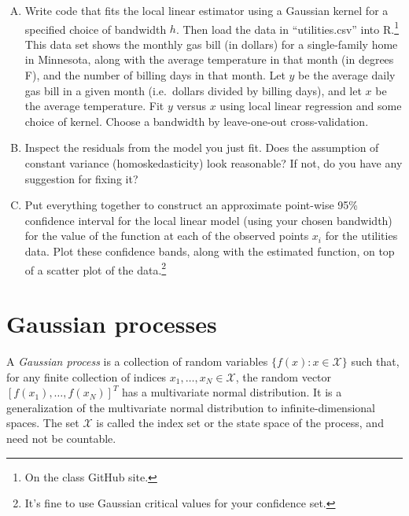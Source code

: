 \documentclass[11pt]{article}
\begin{document}
\begin{enumerate}[(A)]
\item Write code that fits the local linear estimator using a Gaussian kernel for a specified choice of bandwidth $h$. Then load the data in ``utilities.csv'' into R.\footnote{On the class GitHub site.}  This data set shows the monthly gas bill (in dollars) for a single-family home in Minnesota, along with the average temperature in that month (in degrees F), and the number of billing days in that month.  Let $y$ be the average daily gas bill in a given month (i.e.~dollars divided by billing days), and let $x$ be the average temperature.  Fit $y$ versus $x$ using local linear regression and some choice of kernel.  Choose a bandwidth by leave-one-out cross-validation.

\item Inspect the residuals from the model you just fit.  Does the assumption of constant variance (homoskedasticity) look reasonable?  If not, do you have any suggestion for fixing it?

\item Put everything together to construct an approximate point-wise 95\% confidence interval for the local linear model (using your chosen bandwidth) for the value of the function at each of the observed points $x_i$ for the utilities data.  Plot these confidence bands, along with the estimated function, on top of a scatter plot of the data.\footnote{It's fine to use Gaussian critical values for your confidence set.}

\end{enumerate}


\section{Gaussian processes}

A \textit{Gaussian process} is a collection of random variables $\{f(x): x \in \mathcal{X}\}$ such that, for any finite collection of indices $x_1, \ldots, x_N \in \mathcal{X}$, the random vector $[f(x_1), \ldots, f(x_N)]^T$ has a multivariate normal distribution.  It is a generalization of the multivariate normal distribution to infinite-dimensional spaces. The set $\mathcal{X}$ is called the index set or the state space of the process, and need not be countable.
\end{document}
